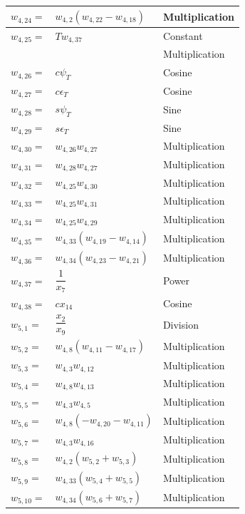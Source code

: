 \begin{longtable}{|p{1.5cm}|l|p{2cm}|}
$w_{4,24}=$ & $ w_{4,2}\left(w_{4,22}-w_{4,18}\right) $ &  Multiplication \\ \hline
$w_{4,25}=$  & $ T w_{4,37} $ & Constant  \\ 
& & Multiplication \\ \hline
$w_{4,26}=$  & $ c\psi_{T}  $ & Cosine  \\ \hline
$w_{4,27}=$  & $ c\epsilon_{T}  $ & Cosine  \\ \hline
$w_{4,28}=$  & $ s\psi_{T}  $ & Sine  \\ \hline
$w_{4,29}=$  & $ s\epsilon_{T}  $ & Sine  \\ \hline
$w_{4,30}=$ & $ w_{4,26}w_{4,27} $ &  Multiplication \\ \hline
$w_{4,31}=$ & $ w_{4,28}w_{4,27} $ &  Multiplication \\ \hline
$w_{4,32}=$ & $ w_{4,25}w_{4,30} $ &  Multiplication \\ \hline
$w_{4,33}=$ & $ w_{4,25}w_{4,31} $ &  Multiplication \\ \hline
$w_{4,34}=$ & $ w_{4,25}w_{4,29} $ &  Multiplication \\ \hline
$w_{4,35}=$ & $ w_{4,33}\left(w_{4,19}-w_{4,14}\right) $ &  Multiplication \\ \hline
$w_{4,36}=$ & $ w_{4,34}\left(w_{4,23}-w_{4,21}\right) $ &  Multiplication \\ \hline
$w_{4,37}=$  & $ \dfrac{1}{x_{7}} $ & Power \\ \hline
$w_{4,38}=$  & $ cx_{14}  $ & Cosine  \\ \hline
$w_{5,1}=$ & $ \dfrac{x_{2}}{x_{9}} $ & Division  \\ \hline
$w_{5,2}=$ & $ w_{4,8}\left(w_{4,11}-w_{4,17}\right) $ & Multiplication  \\ \hline
$w_{5,3}=$ & $ w_{4,3}w_{4,12} $ & Multiplication \\ \hline
$w_{5,4}=$ & $ w_{4,8}w_{4,13} $ & Multiplication  \\ \hline
$w_{5,5}=$ & $ w_{4,3}w_{4,5} $ &  Multiplication  \\ \hline
$w_{5,6}=$ & $ w_{4,8}\left(-w_{4,20}-w_{4,11}\right) $ &  Multiplication  \\ \hline
$w_{5,7}=$ & $ w_{4,3}w_{4,16} $ & Multiplication \\ \hline
$w_{5,8}=$ & $ w_{4,2}\left(w_{5,2}+w_{5,3}\right) $ & Multiplication \\ \hline
$w_{5,9}=$ & $ w_{4,33}\left(w_{5,4}+w_{5,5}\right) $ & Multiplication \\ \hline
$w_{5,10}=$ & $ w_{4,34}\left(w_{5,6}+w_{5,7}\right) $ & Multiplication \\ \hline

\end{longtable}
